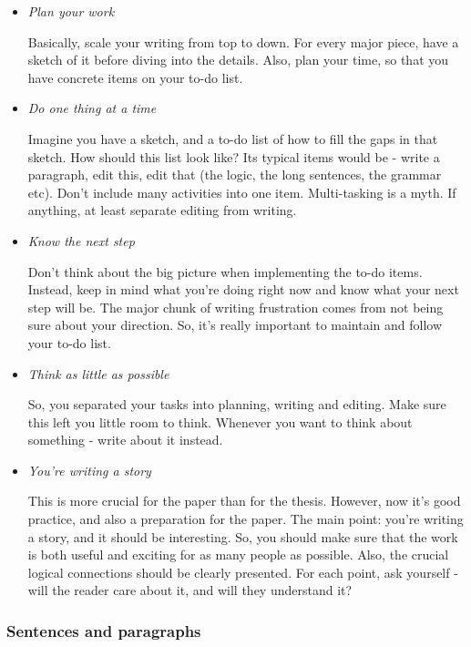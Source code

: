 \documentclass[10pt, a4paper]{article}
\begin{document}
\begin{itemize}
\item \textit{Plan your work}

Basically, scale your writing from top to down. For every major piece, have a sketch of it before diving into the details. Also, plan your time, so that you have concrete items on your to-do list.

\item \textit{Do one thing at a time}

Imagine you have a sketch, and a to-do list of how to fill the gaps in that sketch. How should this list look like? Its typical items would be - write a paragraph, edit this, edit that (the logic, the long sentences, the grammar etc). Don't include many activities into one item. Multi-tasking is a myth. If anything, at least separate editing from writing.

\item \textit{Know the next step}

Don't think about the big picture when implementing the to-do items. Instead, keep in mind what you're doing right now and know what your next step will be. The major chunk of writing frustration comes from not being sure about your direction. So, it's really important to maintain and follow your to-do list.

\item \textit{Think as little as possible}

So, you separated your tasks into planning, writing and editing. Make sure this left you little room to think. Whenever you want to think about something - write about it instead.

\item \textit{You're writing a story}

This is more crucial for the paper than for the thesis. However, now it's good practice, and also a preparation for the paper. The main point: you're writing a story, and it should be interesting. So, you should make sure that the work is both useful and exciting for as many people as possible. Also, the crucial logical connections should be clearly presented. For each point, ask yourself - will the reader care about it, and will they understand it?
\end{itemize}

\subsubsection*{Sentences and paragraphs}
\end{document}
